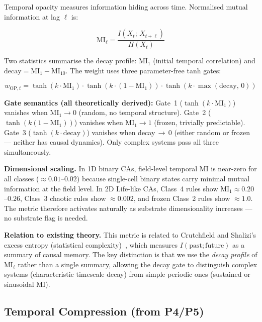 \documentclass[12pt,a4paper]{article}
\begin{document}
Temporal opacity measures information hiding across time.
Normalised mutual information at lag $\ell$ is:

\begin{equation}
\mathrm{MI}_\ell = \frac{I(X_t;\,X_{t+\ell})}{H(X_t)}
\label{eq:mi}
\end{equation}

Two statistics summarise the decay profile:
$\mathrm{MI}_1$ (initial temporal correlation) and
$\text{decay} = \mathrm{MI}_1 - \mathrm{MI}_{10}$.
The weight uses three parameter-free tanh gates:

\begin{equation}
w_{\text{OP},t} = \tanh(k\cdot\mathrm{MI}_1)
                  \cdot\tanh(k\cdot(1-\mathrm{MI}_1))
                  \cdot\tanh(k\cdot\max(\text{decay},\,0))
\label{eq:wopt}
\end{equation}

\textbf{Gate semantics (all theoretically derived):}
Gate~1 ($\tanh(k\cdot\mathrm{MI}_1)$) vanishes when $\mathrm{MI}_1\!\to\!0$
(random, no temporal structure).
Gate~2 ($\tanh(k(1-\mathrm{MI}_1))$) vanishes when
$\mathrm{MI}_1\!\to\!1$ (frozen, trivially predictable).
Gate~3 ($\tanh(k\cdot\text{decay})$) vanishes when decay\,$\to$\,0
(either random or frozen --- neither has causal dynamics).
Only complex systems pass all three simultaneously.

\textbf{Dimensional scaling.}
In 1D binary CAs, field-level temporal MI is near-zero for all classes
(${\approx}0.01$--$0.02$) because single-cell binary states carry
minimal mutual information at the field level.
In 2D Life-like CAs, Class~4 rules show
$\mathrm{MI}_1\approx0.20$--$0.26$, Class~3 chaotic rules show
${\approx}0.002$, and frozen Class~2 rules show ${\approx}1.0$.
The metric therefore activates naturally as substrate dimensionality
increases --- no substrate flag is needed.

\textbf{Relation to existing theory.}
This metric is related to Crutchfield and Shalizi's excess entropy
(statistical complexity)~\cite{crutchfield2001}, which measures
$I(\text{past};\text{future})$ as a summary of causal memory.
The key distinction is that we use the \emph{decay profile} of
$\mathrm{MI}_\ell$ rather than a single summary, allowing the decay
gate to distinguish complex systems (characteristic timescale decay)
from simple periodic ones (sustained or sinusoidal MI).

\subsection{Temporal Compression (from P4/P5)}
\end{document}
